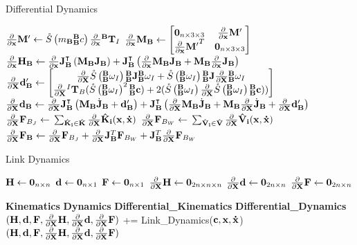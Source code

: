 \begin{algorithm}[H]
	\caption{Differential Dynamics}\label{alg:diff_dynamics}
	\begin{algorithmic}
	\State $\partialx{}\M' \gets \S{m_\B {\BB}c}\partialx{}{^\B\T_I}$
	\State $\partialx{}\M_\B \gets \begin{bmatrix}{\ZERO_{n \times 3 \times 3}} & \partialx{}\M' \\ {\partialx{}\M'}^T & \ZERO_{n \times 3 \times 3} \end{bmatrix}$
	\State $\partialx{}\H_\B \gets \partialx{}\J_\B\transpose \left(\M_\B\J_\B\right) + \J_\B\transpose  \left(\frac{\partial}{\partial \x}\M_\B\J_\B + \M_\B\frac{\partial}{\partial \x}\J_\B\right)$
	\State $\partialX{}\d_\B' \gets \begin{bmatrix}                            
	\partialX{}\S{\BB\omega_I } {\BB\J} {\BB\omega_I} + \S{\BB\omega_I }{\BB\J}\partialX{}{\BB\omega_I} \\
	\partialX{}{^I\T_B}(\S{\BB\omega_I}^2 {\BB\com}) + 2(\S{\BB\omega_I}\partialX{}\S{\BB\omega_I} {\BB\com}))\\
	\end{bmatrix}$
	\State $\partialX{}\d_\B \gets \partialX{}\J\transpose_\B \left (\M_\B \dotJ_\B + \d'_\B \right) + \J\transpose_\B \left (\partialX{} \M_\B \dotJ_\B + \M_\B \partialX{} \dotJ_\B + \partialX{} \d'_\B \right)$
	\State $\partialX{}\F_{B_J} \gets \Big.\sum_{\mathbf{\hat{K}_i} \in \mathbf{\hat{K}}}\partialX{}\mathbf{\hat{K}_i(\x, \dotx)} $
		\State $\partialX{}\F_{B_W} \gets \Big.\sum_{\mathbf{\hat{V}_i} \in \mathbf{\hat{V}}}\partialX{}\mathbf{\hat{V}_i(\x, \dotx)} $
		\State $\partialX{}\F_\B \gets \partialX{}\F_{B_J} + \partialX{}\J_\B^T \F_{B_W} + \J_\B^T \partialX{}\F_{B_W}$
	\end{algorithmic}
\end{algorithm}

\begin{algorithm}[H]
	\caption{Link Dynamics}\label{alg:dyn}
	\begin{algorithmic}
	\State $\H \gets \ZERO_{n \times n}$
	\State $\d \gets \ZERO_{n \times 1}$
	\State $\F \gets \ZERO_{n \times 1}$
	\State $\partialX{}\H \gets \ZERO_{2n \times n \times n}$
	\State $\partialX{}\d \gets \ZERO_{2n \times n}$
	\State $\partialX{}\F \gets \ZERO_{2n \times n}$
	
	\State \textbf{Kinematics}
	\State \textbf{Dynamics}
	\State \textbf{Differential\_Kinematics}
	\State \textbf{Differential\_Dynamics}
	\For {$\mathbf{c} \in \mathbf{c}_\B$}
	\State $(\H, \d,\F, \partialX{}\H, \partialX{}\d,\partialX{}\F)  $ += Link\_Dynamics($\mathbf{c}, \x, \dotx$) 
	\EndFor
	\State \Return $(\H, \d,\F, \partialX{}\H, \partialX{}\d,\partialX{}\F)$ 
	\end{algorithmic}
\end{algorithm}

